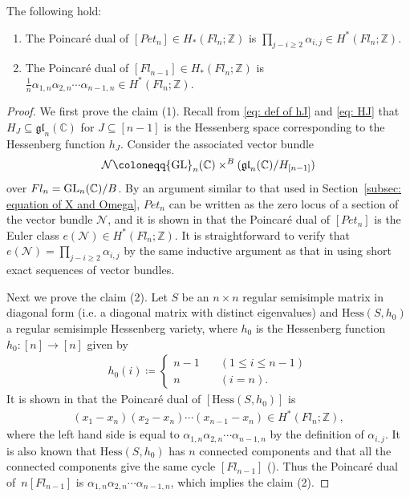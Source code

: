 \begin{lemma}\label{lem: Poincare dual}
The following hold:
\begin{enumerate}
 \item The Poincar\'e dual of $[Pet_{n}]\in H_*(Fl_n;{\mathbb Z})$ is $\prod_{j-i\ge2}\alpha_{i, j}\in H^*(Fl_n;{\mathbb Z})$.
 \item The Poincar\'e dual of $[Fl_{n-1}]\in H_*(Fl_n;{\mathbb Z})$ is $\frac{1}{n}\alpha_{1,n}\alpha_{2,n}\cdots\alpha_{n-1,n}\in H^*(Fl_n;{\mathbb Z})$.
\end{enumerate}
\end{lemma}

\begin{proof}
We first prove the claim (1). Recall from \eqref{eq: def of hJ} and \eqref{eq: HJ} that $H_J\subseteq \mathfrak{gl}_n({\mathbb C})$ for $J\subseteq[n-1]$ is the Hessenberg space corresponding to the Hessenberg function $h_J$. Consider the associated vector bundle 
\begin{align*}
\mathcal{N}\coloneqq {\rm GL}_n({\mathbb C})\times^B (\mathfrak{gl}_n({\mathbb C})/H_{[n-1]})
\end{align*}
over $Fl_n={\rm GL}_n({\mathbb C})/B$. By an argument similar to that used in Section~\ref{subsec: equation of X and Omega}, $Pet_{n}$ can be written as the zero locus of a section of the vector bundle $\mathcal{N}$, and it is shown in \cite[Corollary~3.9]{ab-fu-ze} that the Poincar\'e dual of $[Pet_{n}]$ is the Euler class $e(\mathcal{N})\in H^*(Fl_n;{\mathbb Z})$. It is straightforward to verify that $e(\mathcal{N})=\prod_{j-i\ge2}\alpha_{i, j}$ by the same inductive argument as that in \cite[Sect.\ 4]{ab-fu-ze} using short exact sequences of vector bundles.

Next we prove the claim (2). Let $S$ be an $n\times n$ regular semisimple matrix in diagonal form (i.e. a diagonal matrix with distinct eigenvalues) and $\text{Hess}(S,h_0)$ a regular semisimple Hessenberg variety, where $h_0$ is the Hessenberg function $h_0\colon [n]\rightarrow [n]$ given by
\begin{align*}
h_0(i) \coloneqq
\begin{cases}
n-1 \quad &(1\le i\le n-1) \\
n &(i=n).
\end{cases}
\end{align*}
It is shown in \cite[Sect,\ 3 and Sect.\ 4]{an-ty} that the Poincar\'{e} dual of $[\text{Hess}(S,h_0)]$ is 
\begin{align*}
(x_1-x_n)(x_2-x_n)\cdots (x_{n-1}-x_n)
\in H^*(Fl_n;{\mathbb Z}),
\end{align*}
where the left hand side is equal to $\alpha_{1,n}\alpha_{2,n}\cdots\alpha_{n-1,n}$ by the  definition of $\alpha_{i,j}$. It is also known that $\text{Hess}(S,h_0)$ has $n$ connected components and that all the connected components give the same cycle $[Fl_{n-1}]$ (\cite[Sect.\ 3]{Teff11}). Thus the Poincar\'e dual of~$n[Fl_{n-1}]$ is 
$\alpha_{1,n}\alpha_{2,n}\cdots\alpha_{n-1,n}$, which implies the claim (2).
\end{proof}

